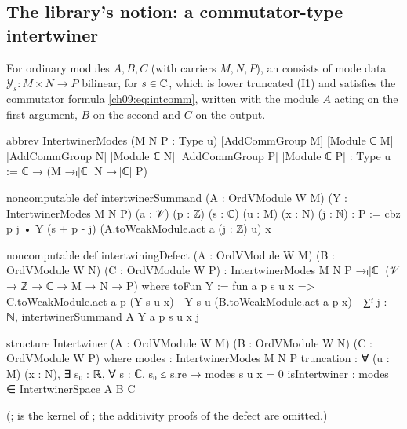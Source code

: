 \subsection{The library's notion: a commutator-type intertwiner}

\begin{definition}\label{ch09:def:intertwiner}
For ordinary modules $A,B,C$ (with carriers $M,N,P$), an  consists of
mode data $\mathcal Y_s\colon M\times N\to P$ bilinear, for $s\in{\mathbb{C}}$, which is lower truncated
(I1) and satisfies the commutator formula \eqref{ch09:eq:intcomm}, written with the module $A$
acting on the first argument, $B$ on the second and $C$ on the output.
\end{definition}

\begin{leancode}
abbrev IntertwinerModes (M N P : Type u) [AddCommGroup M] [Module ℂ M] [AddCommGroup N]
    [Module ℂ N] [AddCommGroup P] [Module ℂ P] : Type u := ℂ → (M →ₗ[ℂ] N →ₗ[ℂ] P)

noncomputable def intertwinerSummand (A : OrdVModule W M) (Y : IntertwinerModes M N P)
    (a : 𝒱) (p : ℤ) (s : ℂ) (u : M) (x : N) (j : ℕ) : P :=
  cbz p j • Y (s + p - j) (A.toWeakModule.act a (j : ℤ) u) x

noncomputable def intertwiningDefect (A : OrdVModule W M) (B : OrdVModule W N) (C : OrdVModule W P) :
    IntertwinerModes M N P →ₗ[ℂ] (𝒱 → ℤ → ℂ → M → N → P) where
  toFun Y := fun a p s u x =>
    C.toWeakModule.act a p (Y s u x) - Y s u (B.toWeakModule.act a p x)
      - ∑ᶠ j : ℕ, intertwinerSummand A Y a p s u x j

structure Intertwiner (A : OrdVModule W M) (B : OrdVModule W N) (C : OrdVModule W P) where
  modes : IntertwinerModes M N P
  truncation : ∀ (u : M) (x : N), ∃ s₀ : ℝ, ∀ s : ℂ, s₀ ≤ s.re → modes s u x = 0
  isIntertwiner : modes ∈ IntertwinerSpace A B C
\end{leancode}
(;  is the kernel of
; the additivity proofs of the defect are omitted.)

